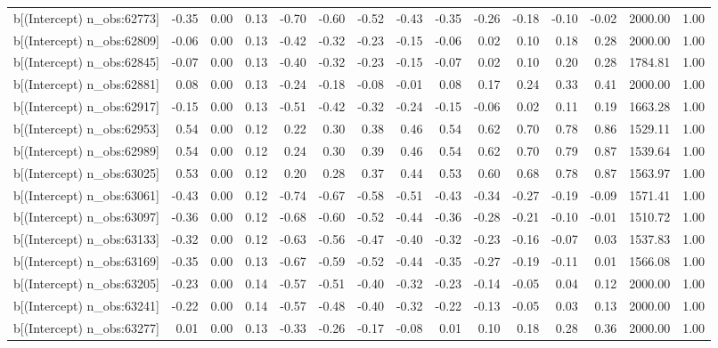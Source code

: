 \begin{table}[ht]
\begin{tabular}{rrrrrrrrrrrrrrr}
  b[(Intercept) n\_obs:62773] & -0.35 & 0.00 & 0.13 & -0.70 & -0.60 & -0.52 & -0.43 & -0.35 & -0.26 & -0.18 & -0.10 & -0.02 & 2000.00 & 1.00 \\ 
  b[(Intercept) n\_obs:62809] & -0.06 & 0.00 & 0.13 & -0.42 & -0.32 & -0.23 & -0.15 & -0.06 & 0.02 & 0.10 & 0.18 & 0.28 & 2000.00 & 1.00 \\ 
  b[(Intercept) n\_obs:62845] & -0.07 & 0.00 & 0.13 & -0.40 & -0.32 & -0.23 & -0.15 & -0.07 & 0.02 & 0.10 & 0.20 & 0.28 & 1784.81 & 1.00 \\ 
  b[(Intercept) n\_obs:62881] & 0.08 & 0.00 & 0.13 & -0.24 & -0.18 & -0.08 & -0.01 & 0.08 & 0.17 & 0.24 & 0.33 & 0.41 & 2000.00 & 1.00 \\ 
  b[(Intercept) n\_obs:62917] & -0.15 & 0.00 & 0.13 & -0.51 & -0.42 & -0.32 & -0.24 & -0.15 & -0.06 & 0.02 & 0.11 & 0.19 & 1663.28 & 1.00 \\ 
  b[(Intercept) n\_obs:62953] & 0.54 & 0.00 & 0.12 & 0.22 & 0.30 & 0.38 & 0.46 & 0.54 & 0.62 & 0.70 & 0.78 & 0.86 & 1529.11 & 1.00 \\ 
  b[(Intercept) n\_obs:62989] & 0.54 & 0.00 & 0.12 & 0.24 & 0.30 & 0.39 & 0.46 & 0.54 & 0.62 & 0.70 & 0.79 & 0.87 & 1539.64 & 1.00 \\ 
  b[(Intercept) n\_obs:63025] & 0.53 & 0.00 & 0.12 & 0.20 & 0.28 & 0.37 & 0.44 & 0.53 & 0.60 & 0.68 & 0.78 & 0.87 & 1563.97 & 1.00 \\ 
  b[(Intercept) n\_obs:63061] & -0.43 & 0.00 & 0.12 & -0.74 & -0.67 & -0.58 & -0.51 & -0.43 & -0.34 & -0.27 & -0.19 & -0.09 & 1571.41 & 1.00 \\ 
  b[(Intercept) n\_obs:63097] & -0.36 & 0.00 & 0.12 & -0.68 & -0.60 & -0.52 & -0.44 & -0.36 & -0.28 & -0.21 & -0.10 & -0.01 & 1510.72 & 1.00 \\ 
  b[(Intercept) n\_obs:63133] & -0.32 & 0.00 & 0.12 & -0.63 & -0.56 & -0.47 & -0.40 & -0.32 & -0.23 & -0.16 & -0.07 & 0.03 & 1537.83 & 1.00 \\ 
  b[(Intercept) n\_obs:63169] & -0.35 & 0.00 & 0.13 & -0.67 & -0.59 & -0.52 & -0.44 & -0.35 & -0.27 & -0.19 & -0.11 & 0.01 & 1566.08 & 1.00 \\ 
  b[(Intercept) n\_obs:63205] & -0.23 & 0.00 & 0.14 & -0.57 & -0.51 & -0.40 & -0.32 & -0.23 & -0.14 & -0.05 & 0.04 & 0.12 & 2000.00 & 1.00 \\ 
  b[(Intercept) n\_obs:63241] & -0.22 & 0.00 & 0.14 & -0.57 & -0.48 & -0.40 & -0.32 & -0.22 & -0.13 & -0.05 & 0.03 & 0.13 & 2000.00 & 1.00 \\ 
  b[(Intercept) n\_obs:63277] & 0.01 & 0.00 & 0.13 & -0.33 & -0.26 & -0.17 & -0.08 & 0.01 & 0.10 & 0.18 & 0.28 & 0.36 & 2000.00 & 1.00 \\ 

\end{tabular}
\end{table}
